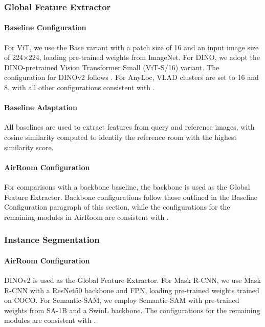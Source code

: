 \subsubsection{Global Feature Extractor}

\paragraph{Baseline Configuration} For ViT, we use the Base variant with a patch size of 16 and an input image size of 224×224, loading pre-trained weights from ImageNet. For DINO, we adopt the DINO-pretrained Vision Transformer Small (ViT-S/16) variant. The configuration for DINOv2 follows . For AnyLoc, VLAD clusters are set to 16 and 8, with all other configurations consistent with .

\paragraph{Baseline Adaptation} All baselines are used to extract features from query and reference images, with cosine similarity computed to identify the reference room with the highest similarity score.

\paragraph{AirRoom Configuration} For comparisons with a backbone baseline, the backbone is used as the Global Feature Extractor. Backbone configurations follow those outlined in the Baseline Configuration paragraph of this section, while the configurations for the remaining modules in AirRoom are consistent with .

\subsubsection{Instance Segmentation}

\paragraph{AirRoom Configuration} DINOv2 is used as the Global Feature Extractor. For Mask R-CNN, we use Mask R-CNN with a ResNet50 backbone and FPN, loading pre-trained weights trained on COCO. For Semantic-SAM, we employ Semantic-SAM with pre-trained weights from SA-1B and a SwinL backbone. The configurations for the remaining modules are consistent with .

